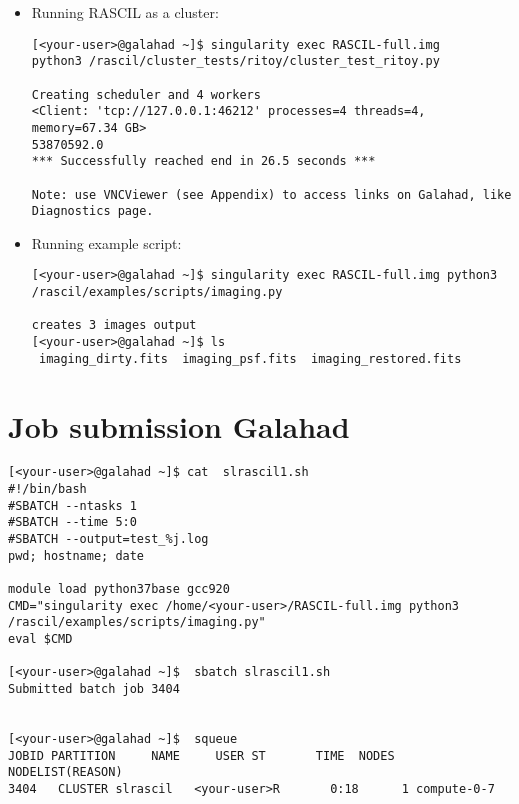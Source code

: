 \documentclass[english]{article}
\begin{document}
\begin{itemize}
\begin{verbatim}
To access the notebook, open this file in a browser:
    file:///home/<your-user>/.local/share/jupyter/runtime/nbserver-21541-open.html
Or copy and paste one of these URLs:
    http://galahad.ast.man.ac.uk:8888/
    ?token=26b1523066c7363b5575dde53d5d7780338bf3dc9cbe2102
    or http://127.0.0.1:8888/
    ?token=26b1523066c7363b5575dde53d5d7780338bf3dc9cbe2102
[I 10:51:56.498 NotebookApp] 302 GET 
/?token=26b1523066c7363b5575dde53d5d7780338bf3dc9cbe2102 
(10.242.203.134) 1.04ms


Access the notebooks on browser using http://galahad.ast.man.ac.uk:8888/
?token=26b1523066c7363b5575dde53d5d7780338bf3dc9cbe2102

Use CTRL <C> to shut down notebook server

\end{verbatim}

    \item Running RASCIL as a cluster:
    \begin{verbatim}
[<your-user>@galahad ~]$ singularity exec RASCIL-full.img 
python3 /rascil/cluster_tests/ritoy/cluster_test_ritoy.py

Creating scheduler and 4 workers
<Client: 'tcp://127.0.0.1:46212' processes=4 threads=4, memory=67.34 GB>
53870592.0
*** Successfully reached end in 26.5 seconds ***

Note: use VNCViewer (see Appendix) to access links on Galahad, like Diagnostics page.
\end{verbatim}

    \item Running example script:
    \begin{verbatim}
[<your-user>@galahad ~]$ singularity exec RASCIL-full.img python3 
/rascil/examples/scripts/imaging.py

creates 3 images output
[<your-user>@galahad ~]$ ls
 imaging_dirty.fits  imaging_psf.fits  imaging_restored.fits

 \end{verbatim}

\end{itemize}

\section{Job submission Galahad} 
\begin{verbatim}
[<your-user>@galahad ~]$ cat  slrascil1.sh
#!/bin/bash
#SBATCH --ntasks 1
#SBATCH --time 5:0
#SBATCH --output=test_%j.log
pwd; hostname; date

module load python37base gcc920
CMD="singularity exec /home/<your-user>/RASCIL-full.img python3 
/rascil/examples/scripts/imaging.py"
eval $CMD

[<your-user>@galahad ~]$  sbatch slrascil1.sh
Submitted batch job 3404


[<your-user>@galahad ~]$  squeue
JOBID PARTITION     NAME     USER ST       TIME  NODES NODELIST(REASON)
3404   CLUSTER slrascil   <your-user>R       0:18      1 compute-0-7

 \end{verbatim}
\end{document}
